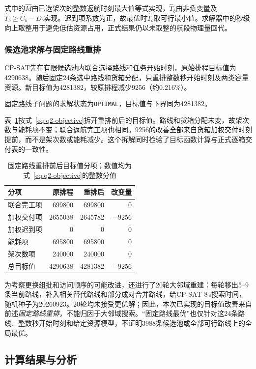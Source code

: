 式中的$\widehat M$由已选架次的整数返航时刻最大值等式实现，$\widehat T_b$由非负变量及$\widehat T_b\geq\widehat C_b-D_b$实现。迟到项系数为正，故最优时$\widehat T_b$取可行最小值。求解器中的秒级向上取整用于避免低估资源占用，正式结果仍以未取整的航段物理量回代。

\subsubsection{候选池求解与固定路线重排}
CP-SAT先在有限候选池内联合选择路线和任务开始时刻，原始排程目标值为4290638。随后固定24条选中路线和货箱分配，只重排整数秒开始时刻及两类容量资源。新目标值为4281382，较原排程减少9256（约0.216\%）。

固定路线子问题的求解状态为\texttt{OPTIMAL}，目标值与下界同为4281382。

表~\ref{tab:q2-objective-parts}按式~\eqref{eq:q2-objective}拆开重排前后的目标值。路线和货箱分配未变，故架次数与能耗项不变；联合返航完工项也相同。9256的改善全部来自货箱加权交付时刻提前，而不是架次数或能耗减少。这个拆解同时检验了目标函数计算与正式逐箱交付表的一致性。
\begin{table}[htbp]
\centering\small
\caption{固定路线重排前后目标值分项；数值均为式~\eqref{eq:q2-objective}的整数分值}
\label{tab:q2-objective-parts}
\begin{tabular}{@{}lrrr@{}}
\toprule
分项 & 原排程 & 重排后 & 改变量\\
\midrule
联合完工项 & 699800 & 699800 & 0\\
加权交付项 & 2655038 & 2645782 & $-9256$\\
加权迟到项 & 0 & 0 & 0\\
能耗项 & 695800 & 695800 & 0\\
架次数项 & 240000 & 240000 & 0\\
\midrule
总目标值 & 4290638 & 4281382 & $-9256$\\
\bottomrule
\end{tabular}
\end{table}

为考察更换组批和访问顺序的可能改进，还进行了20轮大邻域重建：每轮移出5--9条当前路线，补入相关替代路线和部分成对合并路线，给CP-SAT 8\,s搜索时间，随机种子为20260923。20轮均未接受更优解；因此，本次已实现的目标值改善来自前述\emph{固定路线重排}，不能归因于大邻域搜索。“固定路线最优”也仅针对这24条路线、整数秒开始时刻和给定资源模型，不证明3988条候选池或全部可行路线上的全局最优。

\subsection{计算结果与分析}

